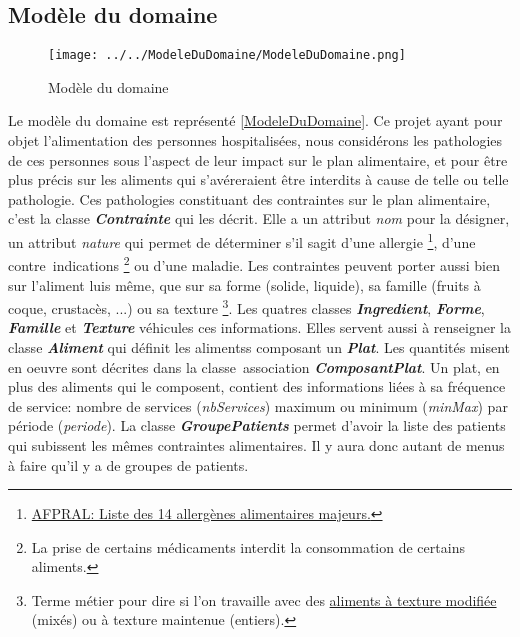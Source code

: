\subsection{Modèle du domaine}
\begin{figure}
  \centering
      \texttt{[image: ../../ModeleDuDomaine/ModeleDuDomaine.png]} %
\caption{Modèle du domaine}
\label{ModeleDuDomaine}
\end{figure}

\newcommand{\classe}[1]{\emph{\textbf{#1}}}
\newcommand{\attribut}[1]{\emph{#1}}
\newcommand{\regleD}[1]{\textcolor{NavyBlue}{#1}}
\newcommand{\regleT}[1]{\textcolor{ForestGreen}{#1}}

Le modèle du domaine est représenté \autoref{ModeleDuDomaine}. Ce projet ayant pour objet l'alimentation des personnes hospitalisées, nous considérons les pathologies de ces personnes sous l'aspect de leur impact sur le plan alimentaire, et pour être plus précis sur les aliments qui s'avéreraient être interdits à cause de telle ou telle pathologie. Ces pathologies constituant des contraintes sur le plan alimentaire, c'est la classe \classe{Contrainte} qui les décrit. Elle a un attribut \attribut{nom} pour la désigner, un attribut \attribut{nature} qui permet de déterminer s'il sagit d'une allergie
\footnote{\label{allergies}\href{https://allergies.afpral.fr/allergie/en-savoir-plus-sur-les-allergies/alimentaires/89-liste-des-14-allergenes-alimentaires-majeurs}{AFPRAL: Liste des 14 allergènes alimentaires majeurs.}},
d'une contre~indications
\footnote{\label{contreIndications}La prise de certains médicaments interdit la consommation de certains aliments.}
ou d'une maladie.
Les contraintes peuvent porter aussi bien sur l'aliment luis même, que sur sa forme (solide, liquide), sa famille (fruits à coque, crustacès, ...) ou sa texture
\footnote{\label{textures}Terme métier pour dire si l'on travaille avec des \href{http://plone.vermeil.org:8080/ehpad/Bibliotheque/Memoires/annee-2012-2013/07 - Les textures modifiees et le plaisir de manger de Jacques Caby.pdf}{aliments à texture modifiée} (mixés) ou à texture maintenue (entiers).}.
Les quatres classes \classe{Ingredient}, \classe{Forme}, \classe{Famille} et \classe{Texture} véhicules ces informations. Elles servent aussi à renseigner la classe \classe{Aliment} qui définit les alimentss composant un \classe{Plat}. Les quantités misent en oeuvre sont décrites dans la classe~association \classe{ComposantPlat}. Un plat, en plus des aliments qui le composent, contient des informations liées à sa fréquence de service: nombre de services (\attribut{nbServices}) maximum ou minimum (\attribut{minMax}) par période (\attribut{periode}).
La classe \classe{GroupePatients} permet d'avoir la liste des patients qui subissent les mêmes contraintes alimentaires. Il y aura donc autant de menus à faire qu'il y a de groupes de patients.

